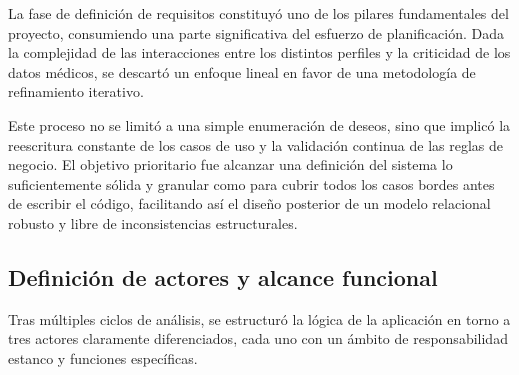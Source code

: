 La fase de definición de requisitos constituyó uno de los pilares fundamentales del proyecto, consumiendo una parte significativa del esfuerzo de planificación. Dada la complejidad de las interacciones entre los distintos perfiles y la criticidad de los datos médicos, se descartó un enfoque lineal en favor de una metodología de refinamiento iterativo.

Este proceso no se limitó a una simple enumeración de deseos, sino que implicó la reescritura constante de los casos de uso y la validación continua de las reglas de negocio. El objetivo prioritario fue alcanzar una definición del sistema lo suficientemente sólida y granular como para cubrir todos los casos bordes antes de escribir el código, facilitando así el diseño posterior de un modelo relacional robusto y libre de inconsistencias estructurales.

\subsection{Definición de actores y alcance funcional}

Tras múltiples ciclos de análisis, se estructuró la lógica de la aplicación en torno a tres actores claramente diferenciados, cada uno con un ámbito de responsabilidad estanco y funciones específicas.

